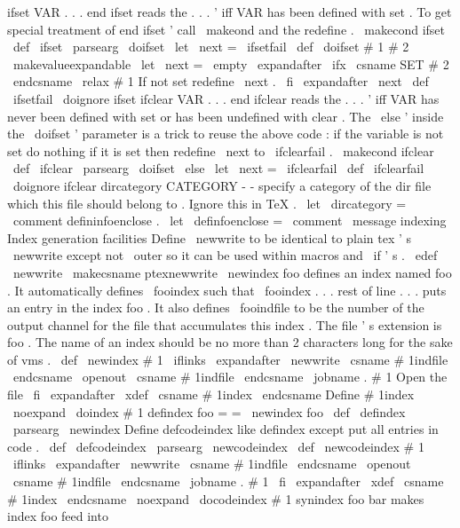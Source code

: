 %
ifset
VAR
.
.
.
end
ifset
reads
the
.
.
.
'
iff
VAR
has
been
defined
%
with
set
.
%
%
To
get
special
treatment
of
end
ifset
'
call
\
makeond
and
the
redefine
.
%
\
makecond
{
ifset
}
\
def
\
ifset
{
\
parsearg
{
\
doifset
{
\
let
\
next
=
\
ifsetfail
}
}
}
\
def
\
doifset
#
1
#
2
{
%
{
%
\
makevalueexpandable
\
let
\
next
=
\
empty
\
expandafter
\
ifx
\
csname
SET
#
2
\
endcsname
\
relax
#
1
%
If
not
set
redefine
\
next
.
\
fi
\
expandafter
}
\
next
}
\
def
\
ifsetfail
{
\
doignore
{
ifset
}
}
%
ifclear
VAR
.
.
.
end
ifclear
reads
the
.
.
.
'
iff
VAR
has
never
been
%
defined
with
set
or
has
been
undefined
with
clear
.
%
%
The
\
else
'
inside
the
\
doifset
'
parameter
is
a
trick
to
reuse
the
%
above
code
:
if
the
variable
is
not
set
do
nothing
if
it
is
set
%
then
redefine
\
next
to
\
ifclearfail
.
%
\
makecond
{
ifclear
}
\
def
\
ifclear
{
\
parsearg
{
\
doifset
{
\
else
\
let
\
next
=
\
ifclearfail
}
}
}
\
def
\
ifclearfail
{
\
doignore
{
ifclear
}
}
%
dircategory
CATEGORY
-
-
specify
a
category
of
the
dir
file
%
which
this
file
should
belong
to
.
Ignore
this
in
TeX
.
\
let
\
dircategory
=
\
comment
%
defininfoenclose
.
\
let
\
definfoenclose
=
\
comment
\
message
{
indexing
}
%
Index
generation
facilities
%
Define
\
newwrite
to
be
identical
to
plain
tex
'
s
\
newwrite
%
except
not
\
outer
so
it
can
be
used
within
macros
and
\
if
'
s
.
\
edef
\
newwrite
{
\
makecsname
{
ptexnewwrite
}
}
%
\
newindex
{
foo
}
defines
an
index
named
foo
.
%
It
automatically
defines
\
fooindex
such
that
%
\
fooindex
.
.
.
rest
of
line
.
.
.
puts
an
entry
in
the
index
foo
.
%
It
also
defines
\
fooindfile
to
be
the
number
of
the
output
channel
for
%
the
file
that
accumulates
this
index
.
The
file
'
s
extension
is
foo
.
%
The
name
of
an
index
should
be
no
more
than
2
characters
long
%
for
the
sake
of
vms
.
%
\
def
\
newindex
#
1
{
%
\
iflinks
\
expandafter
\
newwrite
\
csname
#
1indfile
\
endcsname
\
openout
\
csname
#
1indfile
\
endcsname
\
jobname
.
#
1
%
Open
the
file
\
fi
\
expandafter
\
xdef
\
csname
#
1index
\
endcsname
{
%
%
Define
#
1index
\
noexpand
\
doindex
{
#
1
}
}
}
%
defindex
foo
=
=
\
newindex
{
foo
}
%
\
def
\
defindex
{
\
parsearg
\
newindex
}
%
Define
defcodeindex
like
defindex
except
put
all
entries
in
code
.
%
\
def
\
defcodeindex
{
\
parsearg
\
newcodeindex
}
%
\
def
\
newcodeindex
#
1
{
%
\
iflinks
\
expandafter
\
newwrite
\
csname
#
1indfile
\
endcsname
\
openout
\
csname
#
1indfile
\
endcsname
\
jobname
.
#
1
\
fi
\
expandafter
\
xdef
\
csname
#
1index
\
endcsname
{
%
\
noexpand
\
docodeindex
{
#
1
}
}
%
}
%
synindex
foo
bar
makes
index
foo
feed
into
